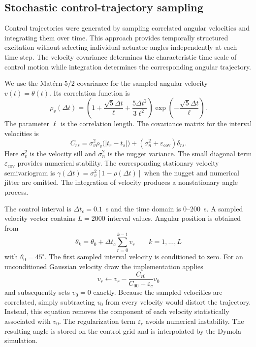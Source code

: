 \subsection{Stochastic control-trajectory sampling}
\label{sec:methods:sampling}

Control trajectories were generated by sampling correlated angular velocities and integrating them over time. This approach provides temporally structured excitation without selecting individual actuator angles independently at each time step. The velocity covariance determines the characteristic time scale of control motion while integration determines the corresponding angular trajectory.

We use the Mat\'ern-$5/2$ covariance for the sampled angular velocity $v(t)=\dot{\theta}(t)$. Its correlation function is
\begin{equation}
 \rho_v(\Delta t)=
 \left(1+\frac{\sqrt{5}\Delta t}{\ell}
       +\frac{5\Delta t^2}{3\ell^2}\right)
 \exp\left(-\frac{\sqrt{5}\Delta t}{\ell}\right).
 \label{eq:mace:matern}
\end{equation}
The parameter $\ell$ is the correlation length. The covariance matrix for the interval velocities is
\begin{equation}
 C_{rs}=\sigma_v^2\rho_v\bigl(|t_r-t_s|\bigr)
       +(\sigma_n^2+\varepsilon_{\mathrm{cov}})\delta_{rs}.
 \label{eq:mace:velocitycov}
\end{equation}
Here $\sigma_v^2$ is the velocity sill and $\sigma_n^2$ is the nugget variance. The small diagonal term $\varepsilon_{\mathrm{cov}}$ provides numerical stability. The corresponding stationary velocity semivariogram is $\gamma(\Delta t)=\sigma_v^2[1-\rho(\Delta t)]$ when the nugget and numerical jitter are omitted. The integration of velocity produces a nonstationary angle process.

The control interval is $\Delta t_c=0.1$~s and the time domain is 0--200~s. A sampled velocity vector contains $L=2000$ interval values. Angular position is obtained from
\begin{equation}
 \theta_k=\theta_0+\Delta t_c\sum_{r=0}^{k-1}v_r
 \qquad  k=1,\ldots,L
 \label{eq:mace:integratedcontrol}
\end{equation}
with $\theta_0=45^\circ$. The first sampled interval velocity is conditioned to zero. For an unconditioned Gaussian velocity draw the implementation applies
\begin{equation}
 v_r\longleftarrow v_r-
 \frac{C_{r0}}{C_{00}+\varepsilon_c}v_0
 \label{eq:mace:conditioning}
\end{equation}
and subsequently sets $v_0=0$ exactly. Because the sampled velocities are correlated, simply subtracting \(v_0\) from every velocity would distort the trajectory. Instead, this equation removes the component of each velocity statistically associated with \(v_0\). The regularization term $\varepsilon_c$ avoids numerical instability. The resulting angle is stored on the control grid and is interpolated by the Dymola simulation.

